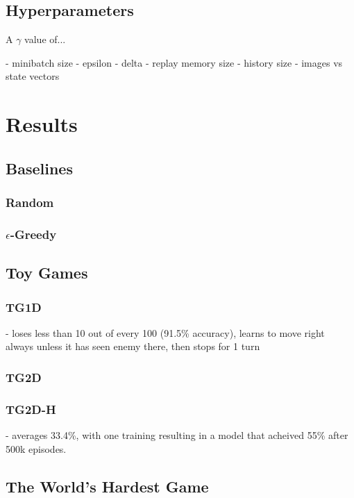 \documentclass[12pt]{article}
\begin{document}
\subsection{Hyperparameters}

A $\gamma$ value of...

- minibatch size
- epsilon
- delta
- replay memory size
- history size
- images vs state vectors

\section{Results}

\subsection{Baselines}

\subsubsection{Random}

\subsubsection{$\epsilon$-Greedy}

\subsection{Toy Games}

\subsubsection{TG1D}

- loses less than 10 out of every 100 (91.5\% accuracy), learns to move right always unless it has seen enemy there, then stops for 1 turn

\subsubsection{TG2D}

\subsubsection{TG2D-H}

- averages 33.4\%, with one training resulting in a model that acheived 55\% after 500k episodes.

\subsection{The World's Hardest Game}
\end{document}
